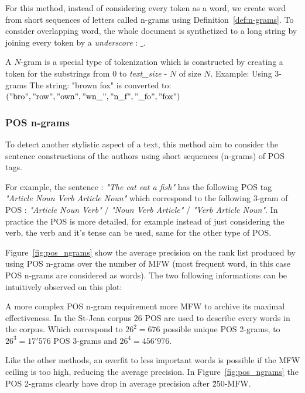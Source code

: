 For this method, instead of considering every token as a word, we create word from short sequences of letters called n-grams using Definition~\ref{def:n-grams}.
To consider overlapping word, the whole document is synthetized to a long string by joining every token by a \textit{underscore} : $\_$.

\begin{definition}[$N$-Grams]
  \label{def:n-grams}
  A $N$-gram is a special type of tokenization which is constructed by creating a token for the substrings from $0$ to \textit{text\_size} - $N$ of size $N$.
  Example: Using 3-grams The string: "brown fox" is converted to: \\
  $("\text{bro}", "\text{row}", "\text{own}", "\text{wn\_}", "\text{n\_f}", "\text{\_fo}", "\text{fox}")$
\end{definition}


\subsubsection{POS n-grams}

To detect another stylistic aspect of a text, this method aim to consider the sentence constructions of the authors using short sequences (n-grams) of POS tags.

For example, the sentence : \textit{"The cat eat a fish"} has the following POS tag \textit{"Article Noun Verb Article Noun"} which correspond to the following 3-gram of POS : \textit{"Article Noun Verb"} / \textit{"Noun Verb Article"} / \textit{"Verb Article Noun"}.
In practice the POS is more detailed, for example instead of just considering the verb, the verb and it's tense can be used, same for the other type of POS.

Figure~\ref{fig:pos_ngrams} show the average precision on the rank list produced by using POS n-grams over the number of MFW (most frequent word, in this case POS n-grams are considered as words).
The two following informations can be intuitively observed on this plot:

A more complex POS n-gram requirement more MFW to archive its maximal effectiveness.
In the St-Jean corpus 26 POS are used to describe every words in the corpus.
Which correspond to $26^2 = 676$ possible unique POS 2-grams, to $26^3 = 17'576$ POS 3-grams and $26^4 = 456'976$.

Like the other methods, an overfit to less important words is possible if the MFW ceiling is too high, reducing the average precision.
In Figure~\ref{fig:pos_ngrams} the POS 2-grams clearly have drop in average precision after \~250-MFW.

